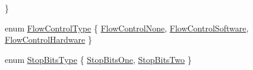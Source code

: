 \begin{DoxyCompactItemize}
 \}
\item 
enum \hyperlink{classosa_serial_port_a006138c4626520d3c2c1e5a78b279435}{Flow\-Control\-Type} \{ \hyperlink{classosa_serial_port_a006138c4626520d3c2c1e5a78b279435a4196a7b3cbc15cf4f190ddc0e19a9254}{Flow\-Control\-None}, 
\hyperlink{classosa_serial_port_a006138c4626520d3c2c1e5a78b279435a2ee117d5ab31cf26e91fc92c5af4e3f7}{Flow\-Control\-Software}, 
\hyperlink{classosa_serial_port_a006138c4626520d3c2c1e5a78b279435a5c4075ee50d41c475a51232e382333f3}{Flow\-Control\-Hardware}
 \}
\item 
enum \hyperlink{classosa_serial_port_aaa561ff95e10634b7ffa9ebf0ff164b5}{Stop\-Bits\-Type} \{ \hyperlink{classosa_serial_port_aaa561ff95e10634b7ffa9ebf0ff164b5adeec2c5e4e7d8f86bdc60559f0bdb353}{Stop\-Bits\-One}, 
\hyperlink{classosa_serial_port_aaa561ff95e10634b7ffa9ebf0ff164b5a06af1341102bbf2fc88fb73b10a3adb8}{Stop\-Bits\-Two}
 \}
\end{DoxyCompactItemize}

